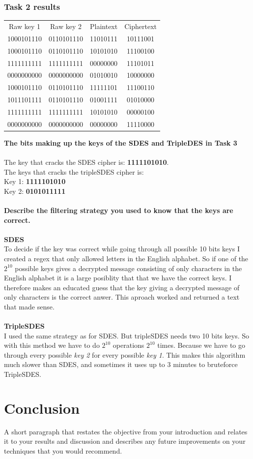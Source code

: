 \documentclass[12pt, letterpaper]{article}
\begin{document}
\subsubsection*{Task 2 results}
\begin{center}
\begin{tabular}{ |c|c|c|c| } 
 \hline
 Raw key 1 & Raw key 2 & Plaintext & Ciphertext \\
1000101110 & 0110101110 & 11010111 & 10111001 \\
1000101110 & 0110101110 & 10101010 & 11100100 \\
1111111111 & 1111111111 & 00000000 & 11101011 \\
0000000000 & 0000000000 & 01010010 & 10000000 \\
1000101110 & 0110101110 & 11111101 & 11100110 \\
1011101111 & 0110101110 & 01001111 & 01010000 \\
1111111111 & 1111111111 & 10101010 & 00000100 \\
0000000000 & 0000000000 & 00000000 & 11110000\\
 \hline
\end{tabular} 
\end{center} 

\textbf{The bits making up the keys of the SDES and TripleDES in Task 3}
\\ \\
The key that cracks the SDES cipher is: \textbf{1111101010}. \\
The keys that cracks the tripleSDES cipher is: \\ Key 1: \textbf{1111101010} \\ Key 2: \textbf{0101011111}
\\ \\
\textbf{Describe the filtering strategy you used to know that the keys are correct.}
\\ \\
\textbf{SDES} \\ 
To decide if the key was correct while going through all possible 10 bits keys I created a regex that only allowed letters in the English alphabet. So if one of the $2^{10}$ possible keys gives a decrypted message consisting of only characters in the English alphabet it is a large posiblity that that we have the correct keys. I therefore makes an educated guess that the key giving a decrypted message of only characters is the correct anwer. This aproach worked and returned a text that made sense.
\\ \\
\textbf{TripleSDES} \\
I used the same strategy as for SDES. But tripleSDES needs two 10 bits keys. So with this method we have to do $2^{10}$ operations $2^{10}$ times. Because we have to go through every possible \textit{key 2} for every possible \textit{key 1}. This makes this algorithm much slower than SDES, and sometimes it uses up to 3 minutes to bruteforce TripleSDES.


\section*{Conclusion}
A short paragraph that restates the objective from your introduction and relates it to your results and discussion and describes any future improvements on your techniques that you would recommend. 
\end{document}
